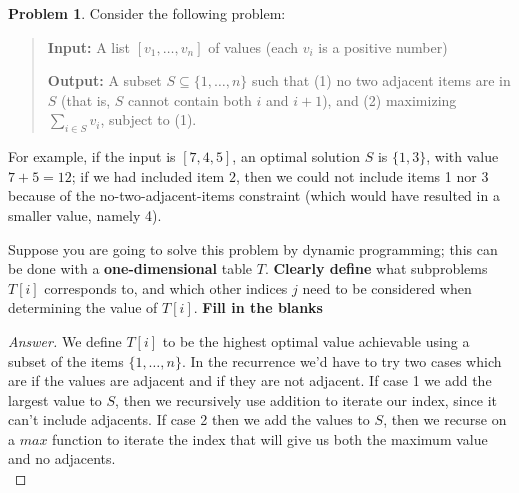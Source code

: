 \documentclass[11pt]{article}
\theoremstyle{definition}
\theoremstyle{definition}
\newtheorem{required}{Problem}
\theoremstyle{definition}
\begin{document}
\setcounter{required}{20}
\begin{required} 
Consider the following problem:
\begin{quotation}
\noindent \textbf{Input: } A list $[v_1, \dotsc, v_n]$ of values (each $v_i$ is a positive number)

\noindent \textbf{Output: } A subset $S \subseteq \{1,\dotsc,n\}$ such that (1) no two adjacent items are in $S$ (that is, $S$ cannot contain both $i$ and $i+1$), and (2) maximizing $\sum_{i \in S} v_i$, subject to (1).
\end{quotation}

For example, if the input is $[7,4,5]$, an optimal solution $S$ is $\{1,3\}$, with value $7+5=12$; if we had included item $2$, then we could not include items 1 nor 3 because of the no-two-adjacent-items constraint (which would have resulted in a smaller value, namely 4).

Suppose you are going to solve this problem by dynamic programming; this can be done with a \textbf{one-dimensional} table $T$. \textbf{Clearly define} what subproblems $T[i]$ corresponds to, and which other indices $j$ need to be considered when determining the value of $T[i]$. \textbf{Fill in the blanks}

\begin{proof}[Answer]
	We define $T[i]$ to be the highest optimal value achievable using a subset of the items $\{1,\dotsc,n\}$. In the recurrence we'd have to try two cases which are if the values are adjacent and if they are not adjacent. If case 1 we add the largest value to $S$, then we recursively use addition to iterate our index, since it can't include adjacents. If case 2 then we add the values to $S$, then we recurse on a $max$ function to iterate the index that will give us both the maximum value and no adjacents.\\
\end{proof}
\end{required}

\vspace{5em}
\end{document}
